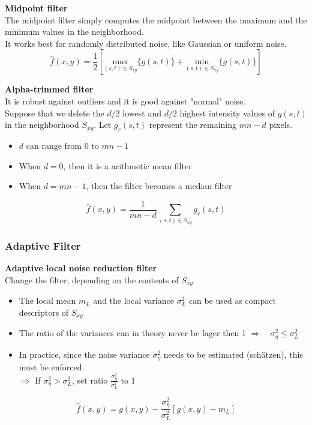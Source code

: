 \textbf{Midpoint filter}\\
The midpoint filter simply computes the midpoint between the maximum and the minimum values in the neighborhood. \\
It works best for randomly distributed noise, like Gaussian or uniform noise.
\begin{equation}
	\hat{f}(x,y)=\frac{1}{2} \left[ \underset{(s,t) \in S_{xy}}{\text{max}}\{g(s,t) \} + \underset{(s,t) \in S_{xy}}{\text{min}}\{g(s,t) \}\right]
\end{equation}

\textbf{Alpha-trimmed filter}\\
It is robust against outliers and it is good against "normal" noise.\\ 

Suppose that we delete the $d/2$ lowest and $d/2$ highest intensity values of $g(s,t)$ in the neighborhood $S_{xy}$. Let $g_r(s,t)$ represent the remaining $mn-d$ pixels.
\begin{itemize}
	\item $d$ can range from 0 to $mn-1$
	\item When $d=0$, then it is a arithmetic mean filter
	\item When $d=mn-1$, then the filter becomes a median filter
\end{itemize}
\begin{equation}
	\hat{f}(x,y)=\frac{1}{mn-d} \sum\limits_{(s,t)\in S_{xy}} g_r(s,t)
\end{equation}

\subsubsection{Adaptive Filter }
\textbf{Adaptive local noise reduction filter}\\
Change the filter, depending on the contents of $S_{xy}$
\begin{itemize}
	\item The local mean $m_L$ and the local variance $\sigma_{L}^2$ can be used as compact descriptors of $S_{xy}$
	\item The ratio of the variances can in theory never be lager then 1 $\Rightarrow \quad\sigma_{\eta}^2 \le \sigma_{L}^2$
	\item In practice, since the noise variance $\sigma_{\eta}^2$ needs to be estimated (schätzen), this must be enforced.\\
	$\Rightarrow$ If $\sigma_{\eta}^2 > \sigma_{L}^2$, set ratio $\frac{\sigma_{\eta}^2}{\sigma_{L}^2}$ to 1
\end{itemize}
\begin{equation}
	\hat{f}(x,y)=g(x,y) - \frac{\sigma_{\eta}^2}{\sigma_{L}^2} \left[g(x,y)-m_L \right]
\end{equation}


